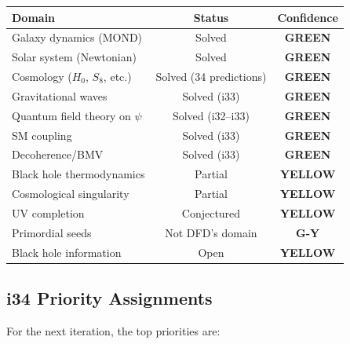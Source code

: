 \documentclass[11pt,a4paper]{article}
\newcommand{\GREEN}{\textcolor{dfdgreen}{\textbf{GREEN}}}
\newcommand{\YELLOW}{\textcolor{dfdyellow}{\textbf{YELLOW}}}
\newcommand{\GY}{\textcolor{dfdgy}{\textbf{G-Y}}}
\begin{document}
\begin{center}
\begin{tabular}{p{4cm}cc}
\toprule
\textbf{Domain} & \textbf{Status} & \textbf{Confidence} \\
\midrule
Galaxy dynamics (MOND) & Solved & \GREEN \\
Solar system (Newtonian) & Solved & \GREEN \\
Cosmology ($H_0$, $S_8$, etc.) & Solved (34 predictions) & \GREEN \\
Gravitational waves & Solved (i33) & \GREEN \\
Quantum field theory on $\psi$ & Solved (i32--i33) & \GREEN \\
SM coupling & Solved (i33) & \GREEN \\
Decoherence/BMV & Solved (i33) & \GREEN \\
Black hole thermodynamics & Partial & \YELLOW \\
Cosmological singularity & Partial & \YELLOW \\
UV completion & Conjectured & \YELLOW \\
Primordial seeds & Not DFD's domain & \GY \\
Black hole information & Open & \YELLOW \\
\bottomrule
\end{tabular}
\end{center}

\subsection{i34 Priority Assignments}

For the next iteration, the top priorities are:
\end{document}
